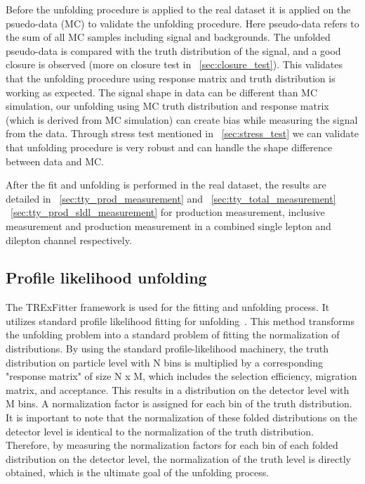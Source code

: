 Before the unfolding procedure is applied to the real dataset it is applied on the psuedo-data (MC) to validate the unfolding procedure. Here pseudo-data refers to the sum of all MC samples including signal and backgrounds. The unfolded pseudo-data is compared with the truth distribution of the signal, and a good closure is observed (more on closure test in ~\cref{sec:closure_test}). This validates that the unfolding procedure using response matrix and truth distribution is working as expected. The signal shape in data can be different than MC simulation, our unfolding using MC truth distribution and response matrix (which is derived from MC simulation) can create bias while measuring the signal from the data. Through stress test mentioned in ~\cref{sec:stress_test} we can validate that unfolding procedure is very robust and can handle the shape difference between data and MC. 

After the fit and unfolding is performed in the real dataset, the results are detailed in ~\cref{sec:tty_prod_measurement} and ~\cref{sec:tty_total_measurement} ~\cref{sec:tty_prod_sldl_measurement} for \tty production measurement, inclusive \tty measurement and \tty production measurement in a combined single lepton and dilepton channel respectively.



\subsection{Profile likelihood unfolding}
\label{sec:profile-likelihodd-unfolding}
The TRExFitter framework is used for the fitting and unfolding process. It utilizes standard profile likelihood fitting for unfolding~\cite{cls_3}. This method transforms the unfolding problem into a standard problem of fitting the normalization of distributions. By using the standard profile-likelihood machinery, the truth distribution on particle level with N bins is multiplied by a corresponding "response matrix" of size N x M, which includes the selection efficiency, migration matrix, and acceptance. This results in a distribution on the detector level with M bins. A normalization factor is assigned for each bin of the truth distribution. It is important to note that the normalization of these folded distributions on the detector level is identical to the normalization of the truth distribution. Therefore, by measuring the normalization factors for each bin of each folded distribution on the detector level, the normalization of the truth level is directly obtained, which is the ultimate goal of the unfolding process.


